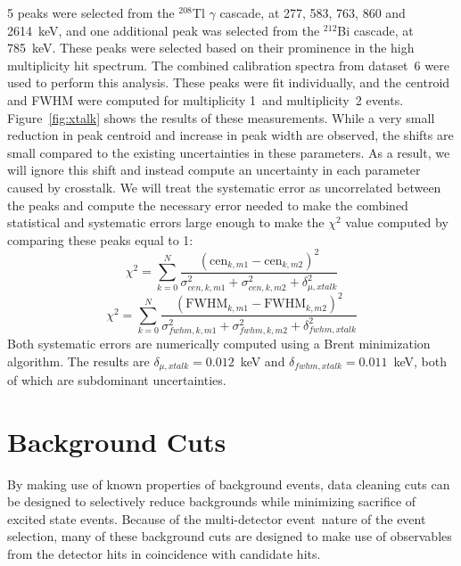 \documentclass[notitlepage,rmp,aps,10pt]{revtex4-1}
\newcommand{\iso}[2]{$^{#1}$#2}
\newcommand{\Tl}[1]{\iso{#1}{Tl}}
\newcommand{\Bi}[1]{\iso{#1}{Bi}}
\newcommand{\md}{multi-detector event}
\begin{document}
5 peaks were selected from the \Tl{208} $\gamma$ cascade, at 277, 583, 763, 860 and 2614~keV, and one additional peak was selected from the \Bi{212} cascade, at 785~keV.
These peaks were selected based on their prominence in the high multiplicity hit spectrum.
The combined calibration spectra from dataset~6 were used to perform this analysis.
These peaks were fit individually, and the centroid and FWHM were computed for multiplicity 1~and multiplicity~2 events.
Figure~\ref{fig:xtalk} shows the results of these measurements.
While a very small reduction in peak centroid and increase in peak width are observed, the shifts are small compared to the existing uncertainties in these parameters.
As a result, we will ignore this shift and instead compute an uncertainty in each parameter caused by crosstalk.
We will treat the systematic error as uncorrelated between the peaks and compute the necessary error needed to make the combined statistical and systematic errors large enough to make the $\chi^2$ value computed by comparing these peaks equal to 1:
\begin{equation}
  \chi^2 = \displaystyle\sum_{k=0}^N \frac{(\mathrm{cen}_{k,m1} - \mathrm{cen}_{k,m2})^2}{\sigma_{cen,k,m1}^2+\sigma_{cen,k,m2}^2+\delta_{\mu,xtalk}^2}
\end{equation}
\begin{equation}
  \chi^2 = \displaystyle\sum_{k=0}^N \frac{(\mathrm{FWHM}_{k,m1} - \mathrm{FWHM}_{k,m2})^2}{\sigma_{fwhm,k,m1}^2+\sigma_{fwhm,k,m2}^2+\delta_{fwhm,xtalk}^2}
\end{equation}
Both systematic errors are numerically computed using a Brent minimization algorithm\cite{brent}.
The results are $\delta_{\mu,xtalk}=0.012$~keV and $\delta_{fwhm,xtalk}=0.011$~keV, both of which are subdominant uncertainties.


\section{Background Cuts}
By making use of known properties of background events, data cleaning cuts can be designed to selectively reduce backgrounds while minimizing sacrifice of excited state events.
Because of the \md\ nature of the event selection, many of these background cuts are designed to make use of observables from the detector hits in coincidence with candidate hits.
\end{document}
